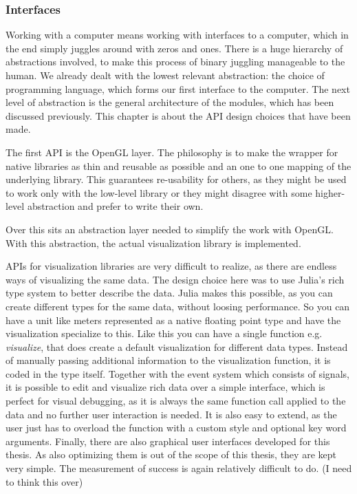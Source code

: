 \subsubsection{Interfaces}

Working with a computer means working with interfaces to a computer, which in the end simply juggles around with zeros and ones. There is a huge hierarchy of abstractions involved, to make this process of binary juggling manageable to the human.
We already dealt with the lowest relevant abstraction: the choice of programming language, which forms our first interface to the computer.
The next level of abstraction is the general architecture of the modules, which has been discussed previously. 
This chapter is about the API design choices that have been made.

The first API is the \ac{OpenGL} layer. 
The philosophy is to make the wrapper for native libraries as thin and reusable as possible and an one to one mapping of the underlying library.
This guarantees re-usability for others, as they might be used to work only with the low-level library or they might disagree with some higher-level abstraction and prefer to write their own.

Over this sits an abstraction layer needed to simplify the work with \ac{OpenGL}.
With this abstraction, the actual visualization library is implemented.

\ac{API}s for visualization libraries are very difficult to realize, as there are endless ways of visualizing the same data.
The design choice here was to use Julia's rich type system to better describe the data. 
Julia makes this possible, as you can create different types for the same data, without loosing performance.
So you can have a unit like meters represented as a native floating point type and have the visualization specialize to this.
Like this you can have a single function e.g. \textit{visualize}, that does create a default visualization for different data types. Instead of manually passing additional information to the visualization function, it is coded in the type itself.
Together with the event system which consists of signals, it is possible to edit and visualize rich data over a simple interface, which is perfect for visual debugging, as it is always the same function call applied to the data and no further user interaction is needed.
It is also easy to extend, as the user just has to overload the function with a custom style and optional key word arguments.
Finally, there are also graphical user interfaces developed for this thesis. As also optimizing them is out of the scope of this thesis, they are kept very simple.
The measurement of success is again relatively difficult to do. (I need to think this over)





